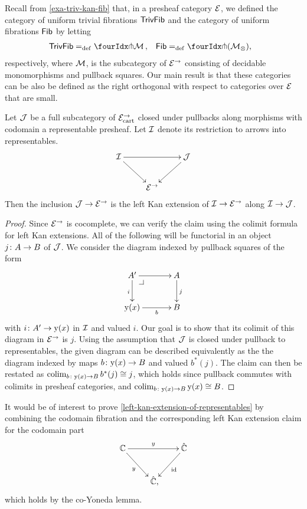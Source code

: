 \documentclass[reqno,10pt,a4paper,oneside,draft]{amsart}
\begin{document}
Recall from \cref{exa-triv-kan-fib} that, in a presheaf category $\catE$, we defined the category of uniform trivial fibrations
$\TrivFib$ and the category of uniform fibrations $\Fib$ by letting
\[
\begin{aligned}
  \TrivFib &\defeq \liftr{\cal{M}}
\, ,&
  \Fib &\defeq \liftr{(\cal{M}_\otimes)}
\rlap{,}
\end{aligned}
\]
respectively, where $\cal{M}$, is the subcategory of $\catE^\to$ consisting of decidable monomorphisms and pullback squares.
Our main result is that these categories can be also be defined as the right orthogonal with respect to categories over
$\catE$ that are small.

\begin{lemma} \label{left-kan-extension-of-representables}
Let $\cal{J}$ be a full subcategory of $\catE_{\cart}^\to$ closed under pullbacks along morphisms with codomain a representable presheaf.
Let $\cal{I}$ denote its restriction to arrows into representables.
\[
\xymatrix{
  \cal{I}
  \ar[rr]
  \ar[dr]
&&
  \cal{J}
  \ar[dl]
\\&
  \catE^\to
}
\]
Then the inclusion $\cal{J} \to \catE^\to$ is the left Kan extension of $\cal{I} \to \catE^\to$ along $\cal{I} \to \cal{J}$.
\end{lemma}

\begin{proof}
Since $\catE^\to$ is cocomplete, we can verify the claim using the colimit formula for left Kan extensions.
All of the following will be functorial in an object $j \co A \to B$ of $\cal{J}$.
We consider the diagram indexed by pullback squares of the form
\[
\xymatrix@C=1.2cm{
  A'
  \ar[r]
  \ar[d]_{i}
  \pullback{dr}
&
  A
  \ar[d]^{j}
\\
  \yon(x)
  \ar[r]_-b
&
  B
}
\]
with $i \co A' \to \yon(x)$ in $\cal{I}$ and valued $i$.
Our goal is to show that its colimit of this diagram in $\catE^\to$ is $j$.
Using the assumption that $\cal{J}$ is closed under pullback to representables, the given diagram can be described equivalently as the the diagram indexed by maps $b \co \yon(x) \to B$ and valued $b^*(j)$.
The claim can then be restated as $\colim_{b \co \yon(x) \to B} b^*(j) \iso j$, which holds since pullback commutes with colimits in presheaf categories, and $\colim_{b \co \yon(x) \to B} \yon(x) \iso B$.
\end{proof}

\begin{remark}
It would be of interest to prove \cref{left-kan-extension-of-representables} by combining the codomain fibration and the corresponding left Kan extension claim for the codomain part
\[
\xymatrix{
  \cat{C}
  \ar[rr]^{y}
  \ar[dr]_{y}
&&
  \hat{\catC}
  \ar[dl]^{\id}
\\&
  \hat{\cat{C}}
\rlap{,}}
\]
which holds by the co-Yoneda lemma.
\end{remark}
\end{document}
